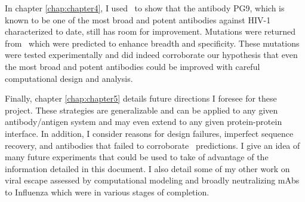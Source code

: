 In chapter \ref{chap:chapter4}, I used \rosettadesign~to show that the antibody PG9, which is known to be one of the most broad and potent antibodies against HIV-1 characterized to date, still has room for improvement. Mutations were returned from \rosettadesign~which were predicted to enhance breadth and specificity. These mutations were tested experimentally and did indeed corroborate our hypothesis that even the most broad and potent antibodies could be improved with careful computational design and analysis.

Finally, chapter \ref{chap:chapter5} details future directions I foresee for these project. These strategies are generalizable and can be applied to any given antibody/antigen system and may even extend to any given protein-protein interface. In addition, I consider reasons for design failures, imperfect sequence recovery, and antibodies that failed to corroborate \silico~predictions. I give an idea of many future experiments that could be used to take of advantage of the information detailed in this document. I also detail  some of my other work on viral escape assessed by computational modeling and broadly neutralizing mAbs to Influenza which were in various stages of completion.